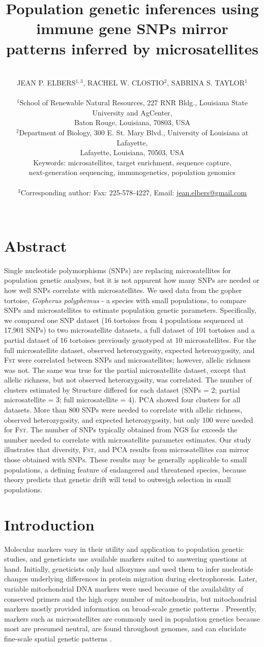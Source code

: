 \documentclass[english]{article}\usepackage[]{graphicx}\usepackage[]{color}
\title{Population genetic inferences using immune gene SNPs mirror patterns inferred by microsatellites}
\date{}
\author{\\
JEAN P. ELBERS$^{1,3}$, RACHEL W. CLOSTIO$^{2}$, SABRINA S. TAYLOR$^{1}$\\\\
$^{1}$School of Renewable Natural Resources, 227 RNR Bldg., Louisiana State University and AgCenter, \\ Baton Rouge, Louisiana, 70803, USA\\
$^{2}$Department of Biology, 300 E. St. Mary Blvd., University of Louisiana at Lafayette, \\ Lafayette, Louisiana, 70503, USA\\
Keywords: microsatellites, target enrichment, sequence capture, \\ next-generation sequencing, immunogenetics, population genomics \\\\
$^{3}$Corresponding author: Fax: 225-578-4227, Email: \underline{jean.elbers@gmail.com}\\\\
}
\begin{document}
\maketitle
\pagebreak{}

\section*{Abstract}
Single nucleotide polymorphisms (SNPs) are replacing microsatellites for population genetic analyses, but it is not apparent how many SNPs are needed or how well SNPs correlate with microsatellites. We used data from the gopher tortoise, \textit{Gopherus polyphemus} - a species with small populations, to compare SNPs and microsatellites to estimate population genetic parameters. Specifically, we compared one SNP dataset (16 tortoises from 4 populations sequenced at 17,901 SNPs) to two microsatellite datasets, a full dataset of 101 tortoises and a partial dataset of 16 tortoises previously genotyped at 10 microsatellites. For the full microsatellite dataset, observed heterozygosity, expected heterozygosity, and \textsc{Fst} were correlated between SNPs and microsatellites; however, allelic richness was not. The same was true for the partial microsatellite dataset, except that allelic richness, but not observed heterozygosity, was correlated. The number of clusters estimated by Structure differed for each dataset (SNPs = 2; partial microsatellite = 3; full microsatellite = 4). PCA showed four clusters for all datasets. More than 800 SNPs were needed to correlate with allelic richness, observed heterozygosity, and expected heterozygosity, but only 100 were needed for \textsc{Fst}. The number of SNPs typically obtained from NGS far exceeds the number needed to correlate with microsatellite parameter estimates. Our study illustrates that diversity, \textsc{Fst}, and PCA results from microsatellites can mirror those obtained with SNPs. These results may be generally applicable to small populations, a defining feature of endangered and threatened species, because theory predicts that genetic drift will tend to outweigh selection in small populations.

\section*{Introduction}
Molecular markers vary in their utility and application to population genetic studies, and geneticists use available markers suited to answering questions at hand. Initially, geneticists only had allozymes and used them to infer nucleotide changes underlying differences in protein migration during electrophoresis. Later, variable mitochondrial DNA markers were used because of the availability of conserved primers and the high copy number of mitochondria, but mitochondrial markers mostly provided information on broad-scale genetic patterns \citep{Moritz_1994}. Presently, markers such as microsatellites are commonly used in population genetics because most are presumed neutral, are found throughout genomes, and can elucidate fine-scale spatial genetic patterns \citep[e.g.,][]{Clostio_et_al_2012}.
\end{document}
